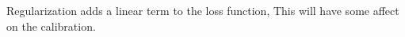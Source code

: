 \begin{answer}
Regularization adds a linear term to the loss function,  This will have some affect on the calibration.
\end{answer}
